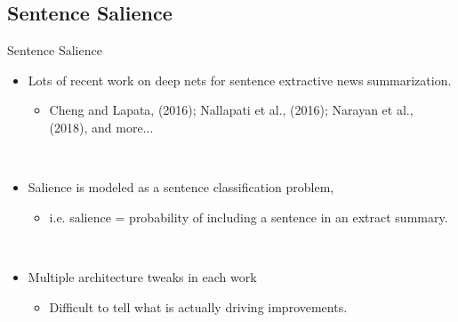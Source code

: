 \subsection{Sentence Salience}

\begin{frame}{Sentence Salience}

    \begin{itemize}
        \item Lots of recent work on deep nets for sentence extractive news 
            summarization. 
            \begin{itemize}
                \item Cheng and Lapata, (2016); Nallapati et al., (2016); Narayan et al., (2018), and more...
            \end{itemize}~\\
        \item \alert{Salience} is modeled as a \alert{sentence classification} problem, 
            \begin{itemize}
        \item i.e. salience =
            probability of including a sentence in an extract summary.
    \end{itemize}~\\

        \item Multiple architecture tweaks in each work
            \begin{itemize}
                \item Difficult to tell
            what is actually driving improvements.
    \end{itemize}
    \end{itemize}

\end{frame}

